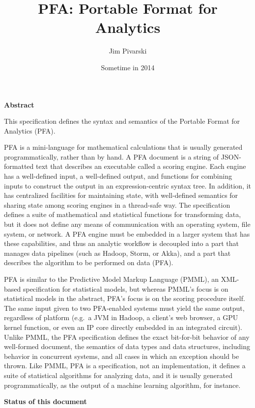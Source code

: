 \documentclass{article}
\title{PFA: Portable Format for Analytics}
\author{Jim Pivarski}
\date{Sometime in 2014}
\theoremstyle{definition}
\begin{document}
\maketitle

{\large \bf Abstract}
\vspace{0.25 cm}

This specification defines the syntax and semantics of the Portable Format for Analytics (PFA).

PFA is a mini-language for mathematical calculations that is usually generated programmatically, rather than by hand.  A PFA document is a string of JSON-formatted text that describes an executable called a scoring engine.  Each engine has a well-defined input, a well-defined output, and functions for combining inputs to construct the output in an expression-centric syntax tree.  In addition, it has centralized facilities for maintaining state, with well-defined semantics for sharing state among scoring engines in a thread-safe way.  The specification defines a suite of mathematical and statistical functions for transforming data, but it does not define any means of communication with an operating system, file system, or network.  A PFA engine must be embedded in a larger system that has these capabilities, and thus an analytic workflow is decoupled into a part that manages data pipelines (such as Hadoop, Storm, or Akka), and a part that describes the algorithm to be performed on data (PFA).  

PFA is similar to the Predictive Model Markup Language (PMML), an XML-based specification for statistical models, but whereas PMML's focus is on statistical models in the abstract, PFA's focus is on the scoring procedure itself.  The same input given to two PFA-enabled systems must yield the same output, regardless of platform (e.g.\ a JVM in Hadoop, a client's web browser, a GPU kernel function, or even an IP core directly embedded in an integrated circuit).  Unlike PMML, the PFA specification defines the exact bit-for-bit behavior of any well-formed document, the semantics of data types and data structures, including behavior in concurrent systems, and all cases in which an exception should be thrown.  Like PMML, PFA is a specification, not an implementation, it defines a suite of statistical algorithms for analyzing data, and it is usually generated programmatically, as the output of a machine learning algorithm, for instance.

\vspace{0.5 cm}
{\large \bf Status of this document}
\vspace{0.25 cm}
\end{document}

